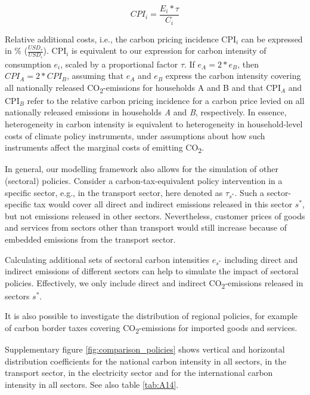 \documentclass[12pt, a4paper]{article}
\begin{document}
\begin{refsection}
\begin{equation}
    CPI_{i} = \frac{E_{i}*\tau}{C_{i}}
\end{equation}

Relative additional costs, i.e., the carbon pricing incidence CPI$_{i}$ can be expressed in \% ($\frac{USD_{\tau}}{USD_{i}}$). CPI$_{i}$ is equivalent to our expression for carbon intensity of consumption $e_{i}$, scaled by a proportional factor $\tau$. If $e_{A}=2*e_{B}$, then $CPI_{A}=2*CPI_{B}$, assuming that $e_{A}$ and $e_{B}$ express the carbon intensity covering all nationally released CO\textsubscript{2}-emissions for households A and B and that CPI$_{A}$ and CPI$_{B}$ refer to the relative carbon pricing incidence for a carbon price levied on all nationally released emissions in households \textit{A} and \textit{B}, respectively. In essence, heterogeneity in carbon intensity is equivalent to heterogeneity in household-level costs of climate policy instruments, under assumptions about how such instruments affect the marginal costs of emitting CO\textsubscript{2}.

In general, our modelling framework also allows for the simulation of other (sectoral) policies. Consider a carbon-tax-equivalent policy intervention in a specific sector, e.g., in the transport sector, here denoted as $\tau_{s^{*}}$. Such a sector-specific tax would cover all direct and indirect emissions released in this sector $s^{*}$, but not emissions released in other sectors. Nevertheless, customer prices of goods and services from sectors other than transport would still increase because of embedded emissions from the transport sector.

Calculating additional sets of sectoral carbon intensities $e_{s^{*}}$ including direct and indirect emissions of different sectors can help to simulate the impact of sectoral policies. Effectively, we only include direct and indirect CO\textsubscript{2}-emissions released in sectors $s^{*}$.

It is also possible to investigate the distribution of regional policies, for example of carbon border taxes covering CO\textsubscript{2}-emissions for imported goods and services. 

Supplementary figure \ref{fig:comparison_policies} shows vertical and horizontal distribution coefficients for the national carbon intensity in all sectors, in the transport sector, in the electricity sector and for the international carbon intensity in all sectors. See also table \ref{tab:A14}.


\end{refsection}
\end{document}
